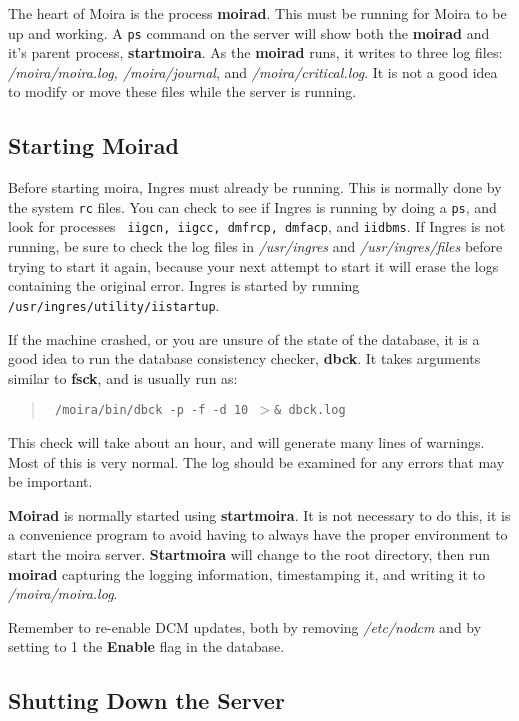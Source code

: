 The heart of Moira is the process {\bf moirad}.  This must be running
for Moira to be up and working.  A {\tt ps} command on the server will
show both the {\bf moirad} and it's parent process, {\bf startmoira}.
As the {\bf moirad} runs, it writes to three log files: {\it
/moira/moira.log, /moira/journal}, and {\it /moira/critical.log}.  It
is not a good idea to modify or move these files while the server is
running.

\subsection{Starting {\bf Moirad}}

Before starting moira, Ingres must already be running.  This is
normally done by the system {\tt rc} files.  You can check to see if
Ingres is running by doing a {\tt ps}, and look for processes {\tt
iigcn, iigcc, dmfrcp, dmfacp}, and {\tt iidbms}.  If Ingres is not
running, be sure to check the log files in {\it /usr/ingres} and {\it
/usr/ingres/files} before trying to start it again, because your next
attempt to start it will erase the logs containing the original error.
Ingres is started by running {\tt /usr/ingres/utility/iistartup}.

If the machine crashed, or you are unsure of the state of the
database, it is a good idea to run the database consistency checker,
{\bf dbck}.  It takes arguments similar to {\bf fsck}, and is usually
run as:
\begin{quotation}\tt
/moira/bin/dbck -p -f -d 10 $>$\& dbck.log
\end{quotation}
This check will take about an hour, and will generate many lines of
warnings.  Most of this is very normal.  The log should be examined
for any errors that may be important.

{\bf Moirad} is normally started using {\bf startmoira}.
  It is not necessary to do this, it is a
convenience program to avoid having to always have the proper
environment to start the moira server.  {\bf Startmoira} will change to
the root directory, then run {\bf moirad} capturing the logging
information, timestamping it, and writing it to {\em /moira/moira.log}.

Remember to re-enable {\bf} DCM updates, both by removing {\em
/etc/nodcm} and by setting to 1 the {\bf Enable} flag in the database.

\subsection{Shutting Down the Server}

